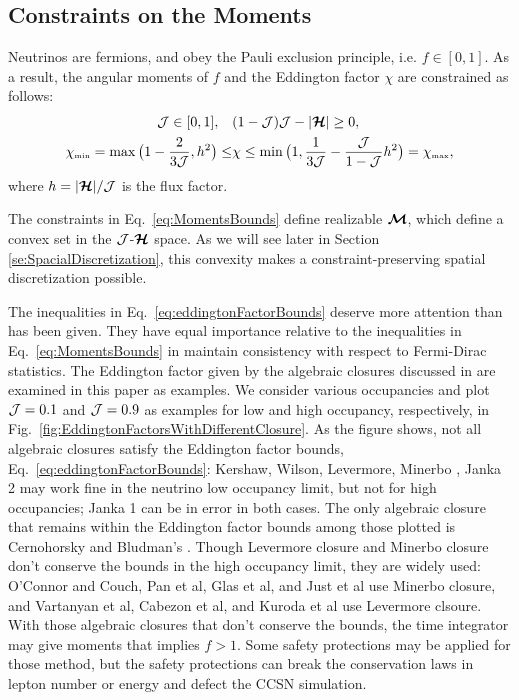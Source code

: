 \subsection{Constraints on the Moments}
Neutrinos are fermions, and obey the Pauli exclusion principle, i.e. $f \in [0,1]$.
As a result, the angular moments of $f$ and the Eddington factor $\chi$ are constrained as follows\cite{levermore_1984,lareckiBanach_2011,kershaw_1976,shohatTamarkin_1943}: 
\begin{align}
\mathcal{J} \in[0,1], \quad &(1-\mathcal{J})\mathcal{J}-|\boldsymbol{\mathcal{H}}| \geq 0, \label{eq:MomentsBounds}\\
  \chi_{\mbox{\tiny min}}
  =\max\big(1-\frac{2}{3\mathcal{J}},h^{2}\big)
  \leq & \chi \leq \min\big(1,\frac{1}{3\mathcal{J}}-\frac{\mathcal{J}}{1-\mathcal{J}}h^{2}\big)=\chi_{\mbox{\tiny max}},
  \label{eq:eddingtonFactorBounds}
\end{align}
where $h = |\boldsymbol{\mathcal{H}}|/\mathcal{J}$ is the flux factor.

The constraints in Eq.~\eqref{eq:MomentsBounds} define realizable $\boldsymbol{\mathcal{M}}$, which define a convex set in the $\mathcal{J}$-$\boldsymbol{\mathcal{H}}$ space.
As we will see later in Section \ref{se:SpacialDiscretization}, this convexity makes a constraint-preserving spatial discretization possible.

The inequalities in Eq.~\eqref{eq:eddingtonFactorBounds} deserve more attention than has been given.
They have equal importance relative to the inequalities in Eq.~\eqref{eq:MomentsBounds} in maintain consistency with respect to Fermi-Dirac statistics.
The Eddington factor given by the algebraic closures discussed in \cite{murchikova_etal_2017} are examined in this paper as examples.
We consider various occupancies and plot $\mathcal{J} = 0.1$ and $\mathcal{J} = 0.9$ as examples for low and high occupancy, respectively, in Fig.~\eqref{fig:EddingtonFactorsWithDifferentClosure}.
As the figure shows, not all algebraic closures satisfy the Eddington factor bounds, Eq.~\eqref{eq:eddingtonFactorBounds}: Kershaw\cite{kershaw_1976}, Wilson\cite{wilson_1975,leblancWilson_1970}, Levermore\cite{levermore_1984}, Minerbo \cite{minerbo_1978}, Janka 2\cite{janka_1992} may work fine in the neutrino low occupancy limit, but not for high occupancies; Janka 1\cite{janka_1991} can be in error in both cases.
The only algebraic closure that remains within the Eddington factor bounds among those plotted is Cernohorsky and Bludman's \cite{cernohorskyBludman_1994}.
Though Levermore closure and Minerbo closure don't conserve the bounds in the high occupancy limit, they are widely used: {O'Connor} and {Couch}\cite{oConnorCouch_2018}, Pan et al\cite{pan_etal_2018}, Glas et al\cite{glas_etal_2018}, and Just et al\cite{just_etal_2018} use Minerbo closure, and Vartanyan et al\cite{vartanyan_etal_2018}, Cabezon et al\cite{cabezon_etal_2018}, and Kuroda et al\cite{kuroda_etal_2016} use Levermore clsoure.
With those algebraic closures that don't conserve the bounds, the time integrator may give moments that implies $f>1$.
Some safety protections may be applied for those method, but the safety protections can break the conservation laws in lepton number or energy and defect the CCSN simulation.

